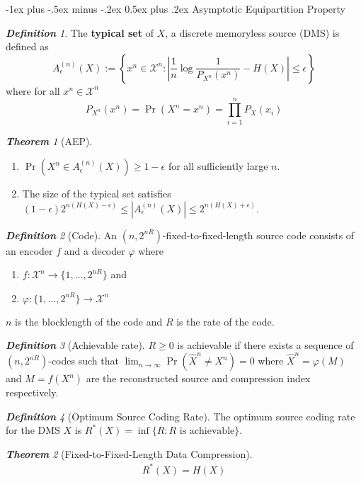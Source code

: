 \documentclass[frenchspacing,9pt,landscape,a4paper]{article}
\makeatletter
\renewcommand{\section}{\@startsection{section}{1}{0mm}%
                                {-1ex plus -.5ex minus -.2ex}%
                                {0.5ex plus .2ex}%
                                {\normalfont\large\bfseries}}
\newcommand{\abs}[1]{\left\lvert #1 \right\rvert}
\DeclareMathOperator{\pr}{Pr}
\theoremstyle{remark}
\newtheorem*{thm}{\textbf{Theorem}}
\newtheorem*{defn}{\textbf{Definition}}
\makeatother
\begin{document}
\begin{multicols}{4}
\section{Asymptotic Equipartition Property}
\begin{defn}
    The \textbf{typical set} of $X$, a discrete memoryless source (DMS) is defined as 
    \[A_\epsilon^{(n)}(X):=\left\{x^n\in\mathcal{X}^n:\abs{\frac{1}{n}\log
    \frac{1}{P_{X^n}(x^n)}-H(X)}\leq\epsilon\right\}\] where for all $x^n\in\mathcal{X}^n$
    \[P_{X^n}(x^n)=\pr(X^n=x^n)=\prod_{i=1}^n P_X(x_i)\]
\end{defn}
\begin{thm}[AEP]
    \begin{enumerate}
        \item $\pr(X^n\in A_\epsilon^{(n)}(X))\geq 1-\epsilon$ for all sufficiently large  $n$.
        \item The size of the typical set satisfies
            $(1-\epsilon)2^{n(H(X)-\epsilon)}\leq\abs{A_\epsilon^{(n)}(X)}\leq 2^{n(H(X)+\epsilon)}$.
    \end{enumerate}
\end{thm}
\begin{defn}[Code]
    An $(n,2^{nR})$-fixed-to-fixed-length source code consists of an encoder  $f$ and a decoder  $\varphi$
    where
    \begin{enumerate}
        \item $f:\mathcal{X}^n\to\{1,\dots,2^{nR}\}$ and
        \item  $\varphi:\{1,\dots,2^{nR}\}\to\mathcal{X}^n$
    \end{enumerate} $n$ is the blocklength of the code and  $R$ is the rate of the code.
\end{defn}
\begin{defn}[Achievable rate]
    $R\geq 0$ is achievable if there exists a sequence of  $(n,2^{nR})$-codes such that
    $\lim_{n\to\infty}\pr(\hat{X}^n\neq X^n)=0$ where  $\hat{X}^n=\varphi(M)$ and  $M=f(X^n)$ are the
    reconstructed source and compression index respectively.
\end{defn}
\begin{defn}[Optimum Source Coding Rate]
    The optimum source coding rate for the DMS $X$ is $R^*(X)=\inf\{R:R\text{ is achievable}\}$.
\end{defn}
\begin{thm}[Fixed-to-Fixed-Length Data Compression]
    \begin{align*}
        R^*(X)=H(X) 
    \end{align*}

\end{thm}
\end{multicols}
\end{document}
